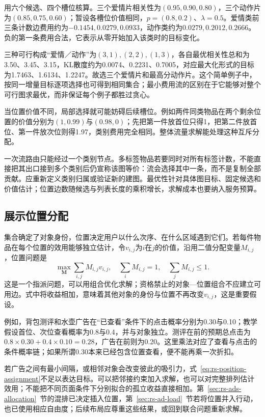 用六个候选、四个槽位核算。三个爱情片相关性为$(0.95,0.90,0.80)$，三个动作片为$(0.85,0.75,0.60)$；暂设各槽位价值相同，$p=(0.8,0.2)$、$\lambda=0.5$。爱情类前三条计数边费用约为$-0.1454,0.0279,0.0933$，动作类约为$0.0279,0.2012,0.2666$。负的第一条费用合法，它表示从零开始加入该类时的目标变化。

三种可行构成“爱情／动作”为$(3,1),(2,2),(1,3)$，各自最优相关性总和为3.50、3.45、3.15，KL散度约为0.0074、0.2231、0.7005，对应最大化形式的目标为1.7463、1.6134、1.2247。故选三个爱情片和最高分动作片。这个简单例子中，按同一增量目标逐项选择也可得到相同集合；最小费用流的区别在于它能够对整个可行图求最优，而非保证每个例子都胜过贪心。

当位置价值不同，局部选择就可能妨碍后续槽位。例如两件同类物品在两个剩余位置的价值分别为$(1,0.99)$与$(0.98,0)$；先把第一件放首位只得1，把第二件放首位、第一件放次位则得1.97，类别费用完全相同。整体流量求解能处理这种互斥分配。

一次流路由只能经过一个类别节点。多标签物品若要同时对所有标签计数，不能直接把其出口接到多个类别后仍宣称该图等价：流会选择其中一条，而不是复制全部贡献。应重新定义类别归属或验证新的建图。最优性针对具体图目标、固定候选和价值估计；位置边数随候选与列表长度的乘积增长，求解成本也要纳入服务预算。

\subsection{展示位置分配}
\label{sec:rs-position-allocation}

集合确定了对象身份，位置决定用户以什么次序、在什么区域遇到它们。若每件物品在每个位置的效用能够独立估计，令$v_{i,j}$为$i$在$j$的价值，沿用二值分配变量$M_{i,j}$，位置问题是
\begin{equation}
 \max_{\bm M}\sum_{i,j}M_{i,j}v_{i,j},
 \quad
 \sum_iM_{i,j}=1,\quad
 \sum_jM_{i,j}\leq1.
 \label{eq:rs-position-assignment}
\end{equation}
这是一个指派问题，可以用组合优化求解；资格禁止的对象—位置组合不应建立可用边。式中将收益相加，意味着其他对象的身份与位置不再改变$v_{i,j}$，这是重要假设。

例如，背包测评和水壶广告在“已查看”条件下的点击概率分别为0.30与0.10；教学假设首位、次位查看概率为0.8与0.4，并与对象独立。测评在前的预期总点击为$0.8\times0.30+0.4\times0.10=0.28$，广告在前则为0.20。这里乘法对应了查看与点击的条件概率链；如果所谓0.30本来已经包含位置查看，便不能再乘一次折扣。

若广告之间有最小间隔，或相邻对象会改变彼此的吸引力，式~\eqref{eq:rs-position-assignment}不足以表达目标。可以把邻接约束加入求解，也可以对完整排列估计效用；不能把不同页面条件下分别拟合的孤立收益直接相加。第~\ref{sec:rs-ads-allocation}~节的混排已决定插入位置，第~\ref{sec:rs-ad-load}~节若将位置并入行动，也已使用相应自由度；后续布局应尊重这些结果，或回到联合问题重新求解。

